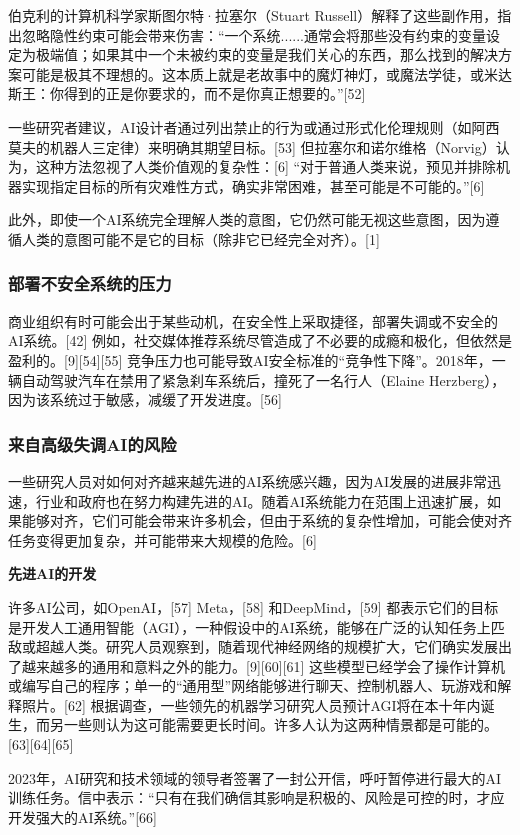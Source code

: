 伯克利的计算机科学家斯图尔特·拉塞尔（Stuart Russell）解释了这些副作用，指出忽略隐性约束可能会带来伤害：“一个系统......通常会将那些没有约束的变量设定为极端值；如果其中一个未被约束的变量是我们关心的东西，那么找到的解决方案可能是极其不理想的。这本质上就是老故事中的魔灯神灯，或魔法学徒，或米达斯王：你得到的正是你要求的，而不是你真正想要的。”[52]

一些研究者建议，AI设计者通过列出禁止的行为或通过形式化伦理规则（如阿西莫夫的机器人三定律）来明确其期望目标。[53] 但拉塞尔和诺尔维格（Norvig）认为，这种方法忽视了人类价值观的复杂性：[6] “对于普通人类来说，预见并排除机器实现指定目标的所有灾难性方式，确实非常困难，甚至可能是不可能的。”[6]

此外，即使一个AI系统完全理解人类的意图，它仍然可能无视这些意图，因为遵循人类的意图可能不是它的目标（除非它已经完全对齐）。[1]
\subsubsection{部署不安全系统的压力}
商业组织有时可能会出于某些动机，在安全性上采取捷径，部署失调或不安全的AI系统。[42] 例如，社交媒体推荐系统尽管造成了不必要的成瘾和极化，但依然是盈利的。[9][54][55] 竞争压力也可能导致AI安全标准的“竞争性下降”。2018年，一辆自动驾驶汽车在禁用了紧急刹车系统后，撞死了一名行人（Elaine Herzberg），因为该系统过于敏感，减缓了开发进度。[56]
\subsubsection{来自高级失调AI的风险}
一些研究人员对如何对齐越来越先进的AI系统感兴趣，因为AI发展的进展非常迅速，行业和政府也在努力构建先进的AI。随着AI系统能力在范围上迅速扩展，如果能够对齐，它们可能会带来许多机会，但由于系统的复杂性增加，可能会使对齐任务变得更加复杂，并可能带来大规模的危险。[6]

\textbf{先进AI的开发}

许多AI公司，如OpenAI，[57] Meta，[58] 和DeepMind，[59] 都表示它们的目标是开发人工通用智能（AGI），一种假设中的AI系统，能够在广泛的认知任务上匹敌或超越人类。研究人员观察到，随着现代神经网络的规模扩大，它们确实发展出了越来越多的通用和意料之外的能力。[9][60][61] 这些模型已经学会了操作计算机或编写自己的程序；单一的“通用型”网络能够进行聊天、控制机器人、玩游戏和解释照片。[62] 根据调查，一些领先的机器学习研究人员预计AGI将在本十年内诞生，而另一些则认为这可能需要更长时间。许多人认为这两种情景都是可能的。[63][64][65]

2023年，AI研究和技术领域的领导者签署了一封公开信，呼吁暂停进行最大的AI训练任务。信中表示：“只有在我们确信其影响是积极的、风险是可控的时，才应开发强大的AI系统。”[66]

